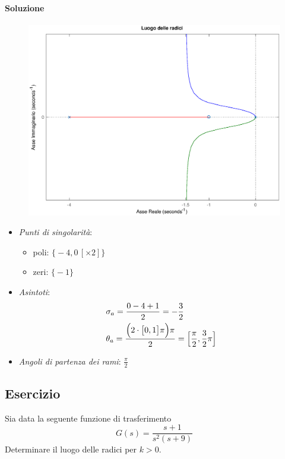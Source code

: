 \paragraph{Soluzione}

\begin{figure}[ht]
	\centering
	\includegraphics[scale=.6]{mod1/assets/rl_ex35}
\end{figure}

\begin{itemize}
	\item \emph{Punti di singolarità}:
		\begin{itemize}
			\item poli: \(\bigl\{ -4, 0\,[\times 2] \bigr\}\)
			\item zeri: \(\bigl\{ -1 \bigr\}\)
		\end{itemize}
	\item \emph{Asintoti}:
		\begin{align*}
			& \sigma_a = \frac{0-4+1}{2} = -\frac{3}{2} \\
			& \theta_a = \frac{\Bigl( 2 \cdot \bigl[ 0,1 \bigr] \pi \Bigr) \pi}{2} = \Bigl[ \frac{\pi}{2}, \frac{3}{2}\pi \Bigr]
		\end{align*}
	\item \emph{Angoli di partenza dei rami}: \(\frac{\pi}{2}\)
\end{itemize}


\subsection{Esercizio}
Sia data la seguente funzione di trasferimento
\[
	G(s) = \frac{s+1}{s^2 (s+9)}
\]
Determinare il luogo delle radici per \(k>0\).


